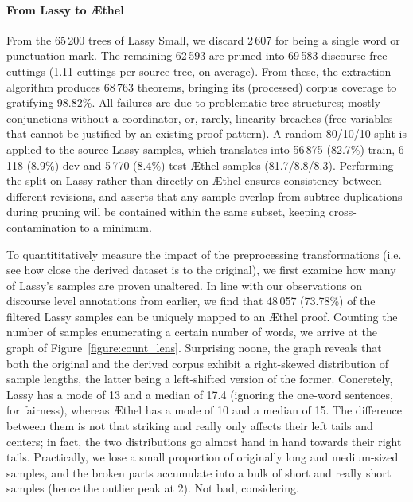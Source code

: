 \paragraph{From Lassy to \AE thel}
From the 65\,200 trees of Lassy Small, we discard 2\,607 for being a single word or punctuation mark.
The remaining 62\,593 are pruned into 69\,583 discourse-free cuttings (1.11 cuttings per source tree, on average).
From these, the extraction algorithm produces 68\,763 theorems, bringing its (processed) corpus coverage to gratifying 98.82\%.
All failures are due to problematic tree structures; mostly conjunctions without a coordinator, or, rarely, linearity breaches (free variables that cannot be justified by an existing proof pattern).
A random 80/10/10 split is applied to the source Lassy samples, which translates into 56\,875 (82.7\%) train, 6\,118 (8.9\%) dev and 5\,770 (8.4\%) test \AE thel samples (81.7/8.8/8.3).
Performing the split on Lassy rather than directly on \AE thel ensures consistency between different revisions, and asserts that any sample overlap from subtree duplications during pruning will be contained within the same subset, keeping cross-contamination to a minimum.

To quantititatively measure the impact of the preprocessing transformations (i.e. see how close the derived dataset is to the original), we first examine how many of Lassy's samples are proven unaltered.
In line with our observations on discourse level annotations from earlier, we find that 48\,057 (73.78\%) of the filtered Lassy samples can be uniquely mapped to an \AE thel proof.
Counting the number of samples enumerating a certain number of words, we arrive at the graph of Figure~\ref{figure:count_lens}.
Surprising noone, the graph reveals that both the original and the derived corpus exhibit a right-skewed distribution of sample lengths, the latter being a left-shifted version of the former.
Concretely, Lassy has a mode of 13 and a median of 17.4 (ignoring the one-word sentences, for fairness), whereas \AE thel has a mode of 10 and a median of 15.
The difference between them is not that striking and really only affects their left tails and centers; in fact, the two distributions go almost hand in hand towards their right tails.
Practically, we lose a small proportion of originally long and medium-sized samples, and the broken parts accumulate into a bulk of short and really short samples (hence the outlier peak at 2).
Not bad, considering.

